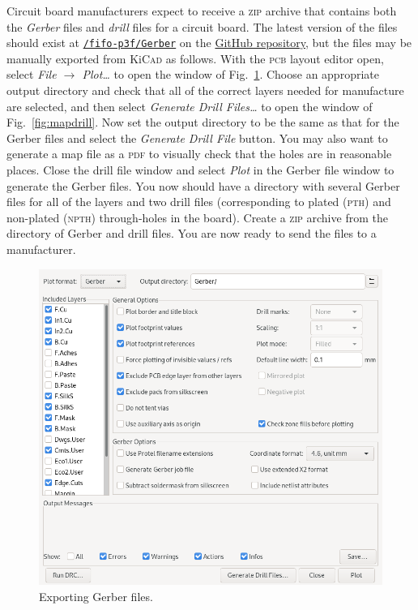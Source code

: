 \documentclass[12pt]{article}
\newcommand{\kicad}{Ki\textsc{Cad}}
\begin{document}
Circuit board manufacturers expect to receive a \textsc{zip} archive that
contains both the \emph{Gerber} files and \emph{drill} files for a circuit
board. The latest version of the files should exist at
\href{https://github.com/lucasilling/AJP_TimeDelay_Git/tree/master/fifo-p3f/Gerber}{\texttt{/fifo-p3f/Gerber}}
on the \href{https://github.com/lucasilling/AJP_TimeDelay_Git}{GitHub
repository}, but the files may be manually exported from \kicad{} as follows.
With the \textsc{pcb} layout editor open, select \textit{File $\to$ Plot\ldots}
to open the window of Fig.~\ref{fig:gerbers}. Choose an appropriate output
directory and check that all of the correct layers needed for manufacture are
selected, and then select \textit{Generate Drill Files\ldots} to open the window
of Fig.~\ref{fig:mapdrill}. Now set the output directory to be the same as that
for the Gerber files and select the \textit{Generate Drill File} button. You may
also want to generate a map file as a \textsc{pdf} to visually check that the
holes are in reasonable places. Close the drill file window and select
\textit{Plot} in the Gerber file window to generate the Gerber files. You now
should have a directory with several Gerber files for all of the layers and two
drill files (corresponding to plated (\textsc{pth}) and non-plated
(\textsc{npth}) through-holes in the board). Create a \textsc{zip} archive from
the directory of Gerber and drill files. You are now ready to send the files to
a manufacturer.

\begin{figure}
  \centering
  \includegraphics[width=\linewidth]{gerbers}
  \caption{Exporting Gerber files.}\label{fig:gerbers}
\end{figure}
\end{document}
